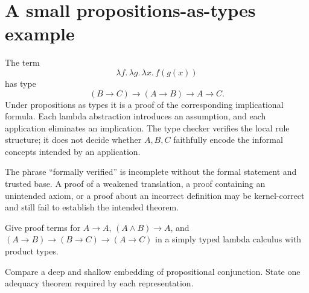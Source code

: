 \section{A small propositions-as-types example}
\label{sec:mechanization-04}

The term
\[
  \lambda f.\,\lambda g.\,\lambda x.\,f(g(x))
\]
has type
\[
  (B\to C)\to(A\to B)\to A\to C.
\]
Under propositions as types it is a proof of the corresponding implicational
formula.  Each lambda abstraction introduces an assumption, and each
application eliminates an implication.  The type checker verifies the local
rule structure; it does not decide whether \(A,B,C\) faithfully encode the
informal concepts intended by an application.

\begin{warning}
The phrase ``formally verified'' is incomplete without the formal statement and
trusted base.  A proof of a weakened translation, a proof containing an
unintended axiom, or a proof about an incorrect definition may be kernel-correct
and still fail to establish the intended theorem.
\end{warning}

\begin{exercise}
\label{ex:mechanization-01}
Give proof terms for \(A\to A\),
\((A\land B)\to A\), and
\((A\to B)\to(B\to C)\to(A\to C)\) in a simply typed lambda calculus with
product types.
\end{exercise}

\begin{exercise}
\label{ex:mechanization-02}
Compare a deep and shallow embedding of propositional conjunction.  State one
adequacy theorem required by each representation.
\end{exercise}

